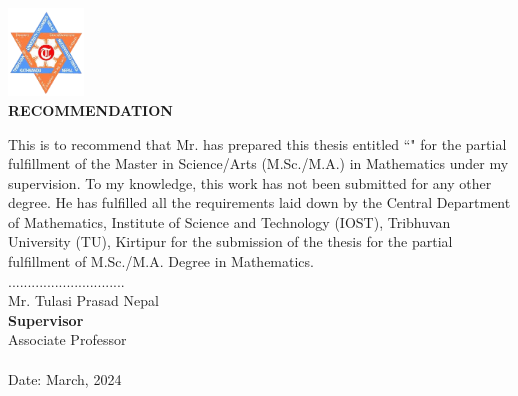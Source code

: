 
\vspace{-1cm}
\begin{center}
	\includegraphics[width=0.15\textwidth]{pictures/tulogo.png}\\[1.5cm]
	{\Large{\bfseries{RECOMMENDATION}}}\\[.5cm]
      \end{center}

This is to recommend that Mr. \textbf{\theauthor} has prepared this thesis entitled ``\textbf{\thetitle}" for the partial fulfillment of the Master in Science/Arts (M.Sc./M.A.) in Mathematics under my supervision. To my knowledge, this work has not been submitted for any other degree.
He has fulfilled all the requirements laid down by the Central Department of Mathematics, Institute of Science and Technology (IOST), Tribhuvan University (TU), Kirtipur for the submission of the thesis for the partial fulfillment of M.Sc./M.A. Degree in Mathematics.\\

\vspace{1.5cm}
\noindent
..............................\\
Mr. Tulasi Prasad Nepal\\
\textbf {Supervisor}\\
Associate Professor\\ \\
Date: March, 2024

\clearpage